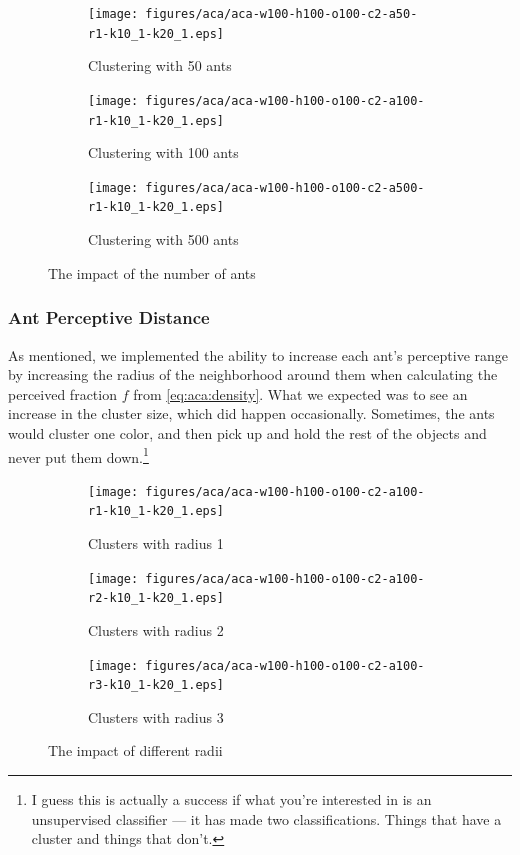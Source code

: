 \documentclass[12pt]{article}
\begin{document}
\begin{figure}[H]
    \begin{subfigure}[b]{0.32\textwidth}
        \centering
        \texttt{[image: figures/aca/aca-w100-h100-o100-c2-a50-r1-k10\_1-k20\_1.eps]}
        \caption{Clustering with 50 ants}\label{fig:aca:num-ants-50}
    \end{subfigure}
    \begin{subfigure}[b]{0.32\textwidth}
        \centering
        \texttt{[image: figures/aca/aca-w100-h100-o100-c2-a100-r1-k10\_1-k20\_1.eps]}
        \caption{Clustering with 100 ants}\label{fig:aca:num-ants-100}
    \end{subfigure}
    \begin{subfigure}[b]{0.32\textwidth}
        \centering
        \texttt{[image: figures/aca/aca-w100-h100-o100-c2-a500-r1-k10\_1-k20\_1.eps]}
        \caption{Clustering with 500 ants}\label{fig:aca:num-ants-200}
    \end{subfigure}
    \caption{The impact of the number of ants}\label{fig:aca:num-ants}
\end{figure}

\subsubsection{Ant Perceptive Distance}
As mentioned, we implemented the ability to increase each ant's perceptive range by increasing the radius of the neighborhood around them when calculating the perceived fraction $f$ from \autoref{eq:aca:density}.
What we expected was to see an increase in the cluster size, which did happen occasionally.
Sometimes, the ants would cluster one color, and then pick up and hold the rest of the objects and never put them down.\footnote{I guess this is actually a success if what you're interested in is an unsupervised classifier --- it has made two classifications. Things that have a cluster and things that don't.}

\begin{figure}[H]
    \begin{subfigure}[b]{0.32\textwidth}
        \centering
        \texttt{[image: figures/aca/aca-w100-h100-o100-c2-a100-r1-k10\_1-k20\_1.eps]}
        \caption{Clusters with radius 1}\label{fig:aca:radius-1}
    \end{subfigure}
    \begin{subfigure}[b]{0.32\textwidth}
        \centering
        \texttt{[image: figures/aca/aca-w100-h100-o100-c2-a100-r2-k10\_1-k20\_1.eps]}
        \caption{Clusters with radius 2}\label{fig:aca:radius-2}
    \end{subfigure}
    \begin{subfigure}[b]{0.32\textwidth}
        \centering
        \texttt{[image: figures/aca/aca-w100-h100-o100-c2-a100-r3-k10\_1-k20\_1.eps]}
        \caption{Clusters with radius 3}\label{fig:aca:radius-3}
    \end{subfigure}
    \caption{The impact of different radii}\label{fig:aca:radius}
\end{figure}
\end{document}
